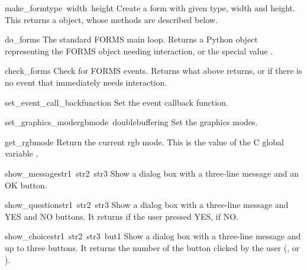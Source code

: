 \renewcommand{\indexsubitem}{(in module fl)}
\begin{funcdesc}{make_form}{type\, width\, height}
Create a form with given type, width and height.  This returns a
 object, whose methods are described below.
\end{funcdesc}

\begin{funcdesc}{do_forms}{}
The standard FORMS main loop.  Returns a Python object representing
the FORMS object needing interaction, or the special value
.
\end{funcdesc}

\begin{funcdesc}{check_forms}{}
Check for FORMS events.  Returns what  above returns,
or  if there is no event that immediately needs
interaction.
\end{funcdesc}

\begin{funcdesc}{set_event_call_back}{function}
Set the event callback function.
\end{funcdesc}

\begin{funcdesc}{set_graphics_mode}{rgbmode\, doublebuffering}
Set the graphics modes.
\end{funcdesc}

\begin{funcdesc}{get_rgbmode}{}
Return the current rgb mode.  This is the value of the C global
variable .
\end{funcdesc}

\begin{funcdesc}{show_message}{str1\, str2\, str3}
Show a dialog box with a three-line message and an OK button.
\end{funcdesc}

\begin{funcdesc}{show_question}{str1\, str2\, str3}
Show a dialog box with a three-line message and YES and NO buttons.
It returns  if the user pressed YES,  if NO.
\end{funcdesc}

\begin{funcdesc}{show_choice}{str1\, str2\, str3\, but1}
Show a dialog box with a three-line message and up to three buttons.
It returns the number of the button clicked by the user
(,  or ).
\end{funcdesc}


